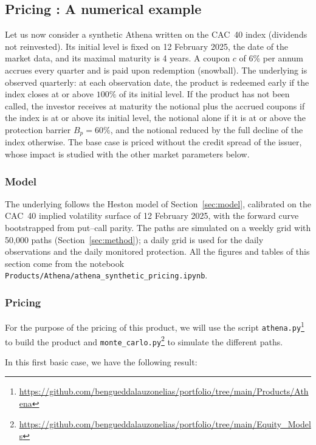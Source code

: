 \documentclass[11pt,a4paper]{article}
\newcommand{\code}[1]{\texttt{#1}}
\begin{document}
\subsection{Pricing : A numerical example}


Let us now consider a synthetic Athena written on the CAC~40 index (dividends not reinvested). Its initial level
is fixed on 12 February 2025, the date of the market data, and its maximal maturity is 4 years. A coupon $c$ of 6\%
per annum accrues every quarter and is paid upon redemption (snowball). The underlying is observed quarterly: at
each observation date, the product is redeemed early if the index closes at or above $100\%$ of its initial level.
If the product has not been called, the investor receives at maturity the notional plus the accrued coupons if the
index is at or above its initial level, the notional alone if it is at or above the protection barrier
$B_p = 60\%$, and the notional reduced by the full decline of the index otherwise. The base case is priced without
the credit spread of the issuer, whose impact is studied with the other market parameters below.

\subsubsection{Model}

The underlying follows the Heston model of Section~\ref{sec:model}, calibrated on the CAC~40 implied volatility
surface of 12 February 2025, with the forward curve bootstrapped from put--call parity. The paths are simulated on a
weekly grid with 50{,}000 paths (Section~\ref{sec:method}); a daily grid is used for the daily observations and the
daily monitored protection. All the figures and tables of this section come from the notebook
\code{Products/Athena/athena\_synthetic\_pricing.ipynb}.

\subsubsection{Pricing}

For the purpose of the pricing of this product, we will use the script \texttt{athena.py}\footnote{\url{https://github.com/bengueddalauzonelias/portfolio/tree/main/Products/Athena}} to build the product and \texttt{monte\_carlo.py}\footnote{\url{https://github.com/bengueddalauzonelias/portfolio/tree/main/Equity_Models}} to simulate the different paths.

In this first basic case, we have the following result:
\end{document}
